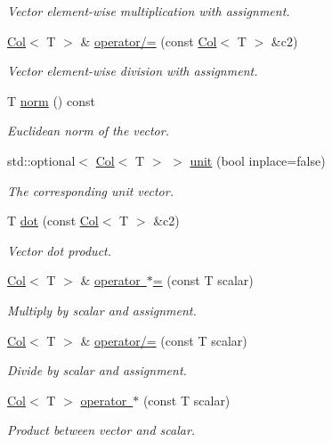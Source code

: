 \begin{DoxyCompactItemize}
\begin{DoxyCompactList}\small\item\em Vector element-\/wise multiplication with assignment. \end{DoxyCompactList}\item 
\mbox{\hyperlink{classtao_1_1_col}{Col}}$<$ T $>$ \& \mbox{\hyperlink{classtao_1_1_col_ab51f1d091fdb1b5a6a4199f4253ecfaa}{operator/=}} (const \mbox{\hyperlink{classtao_1_1_col}{Col}}$<$ T $>$ \&c2)
\begin{DoxyCompactList}\small\item\em Vector element-\/wise division with assignment. \end{DoxyCompactList}\item 
T \mbox{\hyperlink{classtao_1_1_col_a229cd5a26d1fa4424150329127ca31d5}{norm}} () const
\begin{DoxyCompactList}\small\item\em Euclidean norm of the vector. \end{DoxyCompactList}\item 
std\+::optional$<$ \mbox{\hyperlink{classtao_1_1_col}{Col}}$<$ T $>$ $>$ \mbox{\hyperlink{classtao_1_1_col_ae913e98d4ed12cc7ee1975b2aff07c05}{unit}} (bool inplace=false)
\begin{DoxyCompactList}\small\item\em The corresponding unit vector. \end{DoxyCompactList}\item 
T \mbox{\hyperlink{classtao_1_1_col_a605b320d536f27395162eff375af8514}{dot}} (const \mbox{\hyperlink{classtao_1_1_col}{Col}}$<$ T $>$ \&c2)
\begin{DoxyCompactList}\small\item\em Vector dot product. \end{DoxyCompactList}\item 
\mbox{\hyperlink{classtao_1_1_col}{Col}}$<$ T $>$ \& \mbox{\hyperlink{classtao_1_1_col_a29c998087d6d7b98ecee1ba9fb7237a9}{operator $\ast$=}} (const T scalar)
\begin{DoxyCompactList}\small\item\em Multiply by scalar and assignment. \end{DoxyCompactList}\item 
\mbox{\hyperlink{classtao_1_1_col}{Col}}$<$ T $>$ \& \mbox{\hyperlink{classtao_1_1_col_abddd1e9737a0cafd50a52fd5063e4851}{operator/=}} (const T scalar)
\begin{DoxyCompactList}\small\item\em Divide by scalar and assignment. \end{DoxyCompactList}\item 
\mbox{\hyperlink{classtao_1_1_col}{Col}}$<$ T $>$ \mbox{\hyperlink{classtao_1_1_col_a734ed22497ede69a2ed0f791bd503355}{operator $\ast$}} (const T scalar)
\begin{DoxyCompactList}\small\item\em Product between vector and scalar. \end{DoxyCompactList}\end{DoxyCompactItemize}

